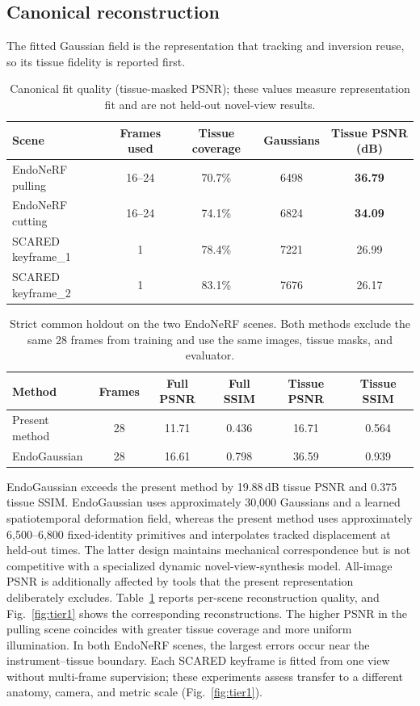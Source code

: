 \documentclass[pdflatex,lineno,referee,sn-vancouver,Numbered]{sn-jnl}
\begin{document}
\subsection{Canonical reconstruction}
The fitted Gaussian field is the representation that tracking and inversion
reuse, so its tissue fidelity is reported first.
\begin{table}[htbp]
\centering
\caption{Canonical fit quality (tissue-masked PSNR); these values measure
representation fit and are not held-out novel-view results.}
\label{tab:tier1}
\footnotesize
\begin{tabular}{lcccc}
\toprule
Scene & Frames used & Tissue coverage & Gaussians & Tissue PSNR (dB) \\
\midrule
EndoNeRF pulling & 16--24 & 70.7\% & 6498 & \textbf{36.79} \\
EndoNeRF cutting & 16--24 & 74.1\% & 6824 & \textbf{34.09} \\
SCARED keyframe\_1 & 1 & 78.4\% & 7221 & 26.99 \\
SCARED keyframe\_2 & 1 & 83.1\% & 7676 & 26.17 \\
\bottomrule
\end{tabular}
\end{table}

\begin{table}[htbp]
\centering
\caption{Strict common holdout on the two EndoNeRF scenes. Both methods
exclude the same 28 frames from training and use the same images, tissue
masks, and evaluator.}
\label{tab:recon_compare}
\small
\begin{tabular}{@{}lccccc@{}}
\toprule
Method & Frames & Full PSNR & Full SSIM & Tissue PSNR & Tissue SSIM \\
\midrule
Present method & 28 & 11.71 & 0.436 & 16.71 & 0.564 \\
EndoGaussian \cite{endogaussian} & 28 & 16.61 & 0.798 & 36.59 & 0.939 \\
\bottomrule
\end{tabular}
\end{table}

EndoGaussian exceeds the present method by 19.88\,dB tissue PSNR and
0.375 tissue SSIM. EndoGaussian uses approximately 30,000 Gaussians and a
learned spatiotemporal deformation field, whereas the present method uses
approximately 6,500--6,800 fixed-identity primitives and interpolates
tracked displacement at held-out times. The latter design maintains
mechanical correspondence but is not competitive with a specialized
dynamic novel-view-synthesis model. All-image PSNR is additionally affected
by tools that the present representation deliberately excludes.
Table~\ref{tab:tier1} reports per-scene reconstruction quality, and
Fig.~\ref{fig:tier1} shows the corresponding reconstructions. The higher
PSNR in the pulling scene coincides with greater tissue coverage and more
uniform illumination. In both EndoNeRF scenes, the largest errors occur
near the instrument--tissue boundary. Each SCARED keyframe is fitted from
one view without multi-frame supervision; these experiments assess
transfer to a different anatomy, camera, and metric scale
(Fig.~\ref{fig:tier1}).
\end{document}
